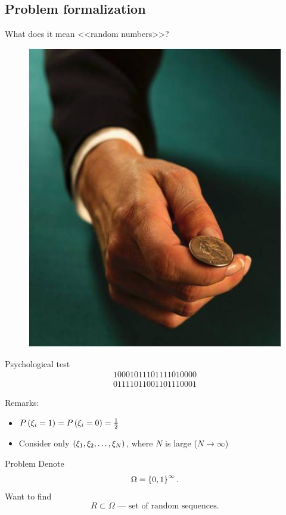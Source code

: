 \documentclass[12pt]{beamer}
\begin{document}
\subsection{Problem formalization}
\begin{frame}{What does it mean <<random numbers>>? }
 \begin{figure}
\includegraphics[scale=0.5]{coin-flip.jpg} 
\end{figure}
\end{frame}


\begin{frame}{Psychological test}
 \begin{align}
  1 0 0 0 1 0 1 1 1 0 1 1 1 1 0 1 0 0 0 0 \\
   0 1 1 1 1 0 1 1 0 0 1 1 0 1 1 1 0 0 0 1
   \nonumber
 \end{align}

\end{frame}

\begin{frame}{}
Remarks: 
 \begin{itemize}
  \item $P\left(\xi_i = 1\right) = P\left(\xi_i = 0\right) = \frac12$
  \pause
  \item Consider only $\left(\xi_1, \xi_2, \ldots, \xi_N\right)$, where $N$ is large ($N\rightarrow \infty$)
 \end{itemize}

 
{\begin{block}{Problem}
Denote $$\Omega = \left\{0,1\right\}^{\infty}.$$ 
Want to find $$R \subset \Omega \text{ --- set of random sequences.}$$
\end{block}
}
\end{frame}
\end{document}
